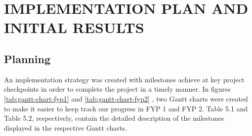 \chapter{IMPLEMENTATION PLAN AND INITIAL RESULTS}
\section{Planning}

An implementation strategy was created with milestones achieve at key project
checkpoints in order to complete the project in a timely manner. In figures \ref{tab:gantt-chart-fyp1} and \ref{tab:gantt-chart-fyp2} , two Gantt charts were created to make it easier to keep
track our progress in FYP 1 and FYP 2.  Table 5.1 and Table 5.2, respectively, contain the detailed description of the milestones displayed in the respective Gantt charts.


